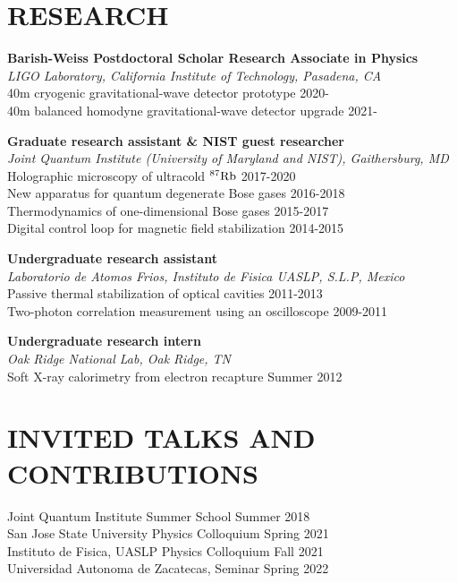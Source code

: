 \documentclass[margin]{res} %
\begin{document}
\begin{resume}
\section{RESEARCH}

{\bf Barish-Weiss Postdoctoral Scholar Research Associate in Physics} \\
{\it LIGO Laboratory, California Institute of Technology, Pasadena, CA}\\
{{40m cryogenic gravitational-wave detector prototype} \hfill 2020-}\\
{{40m balanced homodyne gravitational-wave detector upgrade} \hfill 2021-}


{\bf Graduate research assistant \& NIST guest researcher} \\
{\it Joint Quantum Institute (University of Maryland and NIST), Gaithersburg, MD}\\
{Holographic microscopy of ultracold ${^{87} {\rm Rb}}$} \hfill 2017-2020 \\
{New apparatus for quantum degenerate Bose gases} \hfill 2016-2018\\
{Thermodynamics of one-dimensional Bose gases} \hfill 2015-2017\\
{Digital control loop for magnetic field stabilization} \hfill 2014-2015

{\bf Undergraduate research assistant} \\
{\it Laboratorio de Atomos Frios, Instituto de Fisica UASLP, S.L.P, Mexico}\\
{Passive thermal stabilization of optical cavities} \hfill 2011-2013\\
{Two-photon correlation measurement using an oscilloscope} \hfill 2009-2011

{\bf Undergraduate research intern} \\
{\it Oak Ridge National Lab, Oak Ridge, TN}\\
{Soft X-ray calorimetry from electron recapture} \hfill Summer 2012\\

\section{INVITED TALKS AND CONTRIBUTIONS}
{Joint Quantum Institute Summer School \hfill Summer 2018}\\
{San Jose State University Physics Colloquium \hfill Spring 2021}\\
{Instituto de Fisica, UASLP Physics Colloquium \hfill Fall 2021}\\
{Universidad Autonoma de Zacatecas, Seminar \hfill Spring 2022}


\end{resume}
\end{document}
